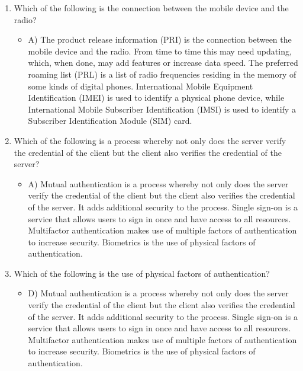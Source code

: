 \documentclass{article}
\begin{document}
\begin{enumerate}
\begin{itemize}
    \end{itemize}
    \item Which of the following is the connection between the mobile device and the radio?
    \begin{itemize}
        \item A) The product release information (PRI) is the connection between the mobile device and
the radio. From time to time this may need updating, which, when done, may add features or
increase data speed. The preferred roaming list (PRL) is a list of radio frequencies residing in
the memory of some kinds of digital phones. International Mobile Equipment Identification
(IMEI) is used to identify a physical phone device, while International Mobile Subscriber
Identification (IMSI) is used to identify a Subscriber Identification Module (SIM) card.
    \end{itemize}
    \item Which of the following is a process whereby not only does the server verify the credential of
the client but the client also verifies the credential of the server?
    \begin{itemize}
        \item A) Mutual authentication is a process whereby not only does the server verify the
credential of the client but the client also verifies the credential of the server. It adds
additional security to the process. Single sign-on is a service that allows users to sign in
once and have access to all resources. Multifactor authentication makes use of multiple
factors of authentication to increase security. Biometrics is the use of physical factors of
authentication.
    \end{itemize}
    \item Which of the following is the use of physical factors of authentication?
    \begin{itemize}
        \item D) Mutual authentication is a process whereby not only does the server verify the
credential of the client but the client also verifies the credential of the server. It adds
additional security to the process. Single sign-on is a service that allows users to sign in
once and have access to all resources. Multifactor authentication makes use of multiple
factors of authentication to increase security. Biometrics is the use of physical factors of
authentication.
    \end{itemize}
\end{enumerate}
\end{document}
